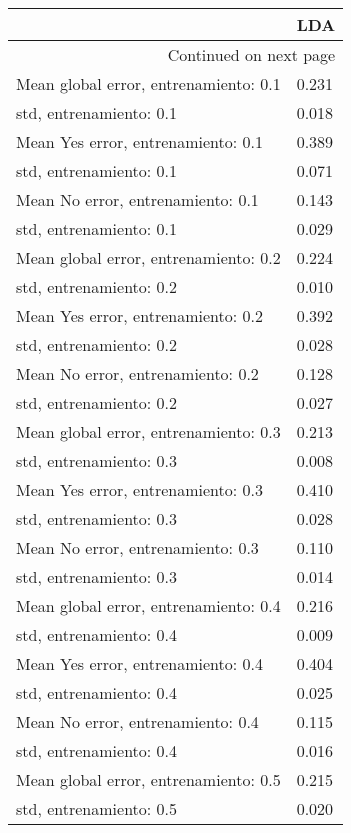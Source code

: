 \begin{longtable}{p{4cm}|p{1.5cm}}
\toprule
{} &   LDA \\
\midrule
\endhead
\midrule
\multicolumn{2}{r}{{Continued on next page}} \\
\midrule
\endfoot

\bottomrule
\endlastfoot
Mean global error, entrenamiento: 0.1 & 0.231 \\
std, entrenamiento: 0.1               & 0.018 \\
Mean Yes error, entrenamiento: 0.1    & 0.389 \\
std, entrenamiento: 0.1               & 0.071 \\
Mean No error, entrenamiento: 0.1     & 0.143 \\
std, entrenamiento: 0.1               & 0.029 \\
Mean global error, entrenamiento: 0.2 & 0.224 \\
std, entrenamiento: 0.2               & 0.010 \\
Mean Yes error, entrenamiento: 0.2    & 0.392 \\
std, entrenamiento: 0.2               & 0.028 \\
Mean No error, entrenamiento: 0.2     & 0.128 \\
std, entrenamiento: 0.2               & 0.027 \\
Mean global error, entrenamiento: 0.3 & 0.213 \\
std, entrenamiento: 0.3               & 0.008 \\
Mean Yes error, entrenamiento: 0.3    & 0.410 \\
std, entrenamiento: 0.3               & 0.028 \\
Mean No error, entrenamiento: 0.3     & 0.110 \\
std, entrenamiento: 0.3               & 0.014 \\
Mean global error, entrenamiento: 0.4 & 0.216 \\
std, entrenamiento: 0.4               & 0.009 \\
Mean Yes error, entrenamiento: 0.4    & 0.404 \\
std, entrenamiento: 0.4               & 0.025 \\
Mean No error, entrenamiento: 0.4     & 0.115 \\
std, entrenamiento: 0.4               & 0.016 \\
Mean global error, entrenamiento: 0.5 & 0.215 \\
std, entrenamiento: 0.5               & 0.020 \\

\end{longtable}
